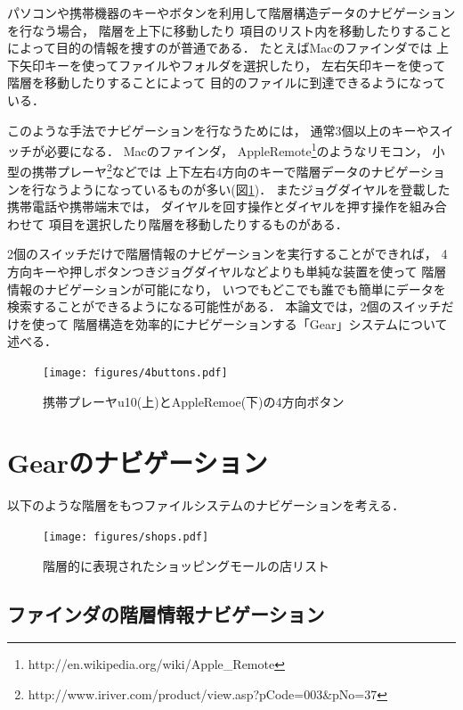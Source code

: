 \documentclass[twoside]{wiss}
\def\GEAR{\textsf{Gear}}
\begin{document}
パソコンや携帯機器のキーやボタンを利用して階層構造データのナビゲーションを行なう場合，
階層を上下に移動したり
項目のリスト内を移動したりすることによって目的の情報を捜すのが普通である．
たとえばMacのファインダでは
上下矢印キーを使ってファイルやフォルダを選択したり，
左右矢印キーを使って階層を移動したりすることによって
目的のファイルに到達できるようになっている．

このような手法でナビゲーションを行なうためには，
通常3個以上のキーやスイッチが必要になる．
%
Macのファインダ，
AppleRemote\footnote{
  \textsf{http://en.wikipedia.org/wiki/Apple\_Remote}
}のようなリモコン，
小型の携帯プレーヤ\footnote{
  \textsf{http://www.iriver.com/product/view.asp?pCode=003\&pNo=37}
}などでは
上下左右4方向のキーで階層データのナビゲーションを行なうようになっているものが多い(図\ref{4buttons})．
またジョグダイヤルを登載した携帯電話や携帯端末では，
ダイヤルを回す操作とダイヤルを押す操作を組み合わせて
項目を選択したり階層を移動したりするものがある．

2個のスイッチだけで階層情報のナビゲーションを実行することができれば，
4方向キーや押しボタンつきジョグダイヤルなどよりも単純な装置を使って
階層情報のナビゲーションが可能になり，
いつでもどこでも誰でも簡単にデータを検索することができるようになる可能性がある．
%
本論文では，2個のスイッチだけを使って
階層構造を効率的にナビゲーションする「{\GEAR}」システムについて述べる．

\begin{figure}[H]
\centerline{\texttt{[image: figures/4buttons.pdf]}}
\caption{携帯プレーヤu10(上)とAppleRemoe(下)の4方向ボタン}
\label{4buttons}
\end{figure}

\section{{\GEAR}のナビゲーション}
\label{description}

以下のような階層をもつファイルシステムのナビゲーションを考える．

\begin{figure}[H]
\centerline{\texttt{[image: figures/shops.pdf]}}
\caption{階層的に表現されたショッピングモールの店リスト}
\label{screenshot1}
\end{figure}

\subsection{ファインダの階層情報ナビゲーション}
\end{document}
